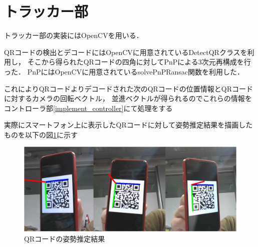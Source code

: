 \section{トラッカー部}
\label{implement_tracker}
トラッカー部の実装にはOpenCVを用いる．

QRコードの検出とデコードにはOpenCVに用意されているDetectQRクラスを利用し，
そこから得られたQRコードの四角に対してPnPによる3次元再構成を行った．
PnPにはOpenCVに用意されているsolvePnPRansac関数を利用した．

これによりQRコードよりデコードされた次のQRコードの位置情報とQRコードに対するカメラの回転ベクトル，
並進ベクトルが得られるのでこれらの情報をコントローラ部\ref{implement_controller}にて処理をする

実際にスマートフォン上に表示したQRコードに対して姿勢推定結果を描画したものを以下の図\ref{pnp_qr_img}に示す

\begin{figure}[htbp]
  \begin{center}
    \includegraphics[clip,width=15.0cm]{img/pnp_qr.png}
    \caption{QRコードの姿勢推定結果}
    \label{pnp_qr_img}
  \end{center}
\end{figure}

